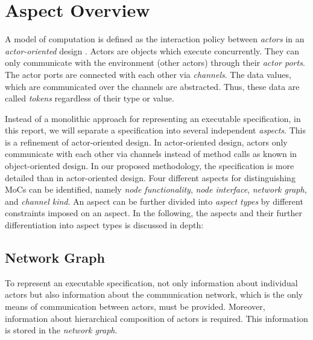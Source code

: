 


\section{Aspect Overview}\label{aspect-overview}

A model of computation \cite{Lee98,embsft:2002} is defined as the
interaction policy between \emph{actors} in an \emph{actor-oriented} design
\cite{agha97abstracting:1997}. Actors are objects which execute concurrently. They can only
communicate with the environment (other actors) through their \emph{actor ports}.
The actor ports are connected with each other via \emph{channels}.
The data values, which are communicated over the channels
are abstracted. Thus, these data are called \emph{tokens} regardless
of their type or value.

Instead of a monolithic approach for representing an executable specification,
in this report, we will separate a specification into several
independent \emph{aspects}.
This is a refinement of actor-oriented design.
In actor-oriented design, actors only
communicate with each other via channels instead of method calls as known
in object-oriented design. In our proposed methodology, the specification is more
detailed than in actor-oriented design.
Four different aspects for distinguishing MoCs can be identified,
namely \emph{node functionality}, \emph{node interface}, \emph{network graph}, and
\emph{channel kind}. An aspect can be further divided into
\emph{aspect types} by different constraints imposed on an aspect.
In the following, the aspects and their further
differentiation into aspect types is discussed in depth:

\subsection{Network Graph}\label{network-graph} 

To represent an executable specification, not only information about
individual actors but also information about the communication network,
which is the only means of communication between actors,
must be provided. Moreover, information about hierarchical
composition of actors is required. This information is stored in
the \emph{network graph}.

